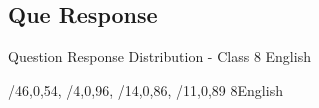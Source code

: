 \label{4.3 C8E Question Response Distribution}
\subsection{Que Response}
\renewcommand{\insertclass}{- Class 8}
\renewcommand{\insertsubject}{ - English}
\begin{frame}{Question Response Distribution - Class 8 English}
\vspace{-3mm}
\begin{minipage}{0.45\paperwidth}
{/{46,0,54},
/{4,0,96},
/{14,0,86},
/{11,0,89}}
{8}{English}
    \end{minipage}%
    \begin{minipage}{0.05\paperwidth}
        \hfill 
    \end{minipage}%
    \begin{minipage}{0.45\paperwidth}
    \queresponselegend
    \end{minipage}
\end{frame}
%



